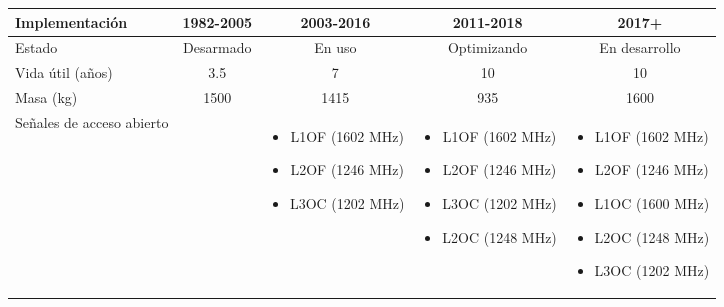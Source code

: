 \begin{center}
\begin{longtable}{|p{3cm}|c|c|c|c|}
        Implementación & 1982-2005 & 2003-2016 & 2011-2018 & 2017+ \\
        \hline
        Estado & Desarmado & En uso & Optimizando & En desarrollo \\
        \hline
        Vida útil (años) & 3.5 & 7 & 10 & 10 \\
        \hline
        Masa (kg) & 1500 & 1415 & 935 & 1600 \\
        \hline
        Señales de acceso abierto & \fontsize{9}{11}\selectfont{L1OF (1602 MHz)} & 
        \parbox[t]{2.5cm}{
            \vspace{-7pt}
            {\fontsize{9}{11}\selectfont
                \begin{itemize}[label={}, leftmargin=0pt, topsep=0pt, partopsep=0pt, parsep=0pt, itemsep=0pt]
                    \item L1OF (1602 MHz)
                    \item L2OF (1246 MHz)
                    \item L3OC (1202 MHz)
                \end{itemize}
            }
        } &
        \parbox[t]{2.5cm}{
            \vspace{-7pt}
            {\fontsize{9}{11}\selectfont
                \begin{itemize}[label={}, leftmargin=0pt, topsep=0pt, partopsep=0pt, parsep=0pt, itemsep=0pt]
                    \item L1OF (1602 MHz)
                    \item L2OF (1246 MHz)
                    \item L3OC (1202 MHz)
                    \item L2OC (1248 MHz)
                \end{itemize}
            }
        } &
        \parbox[t]{2.5cm}{
            \vspace{-7pt}
            {\fontsize{9}{11}\selectfont
                \begin{itemize}[label={}, leftmargin=0pt, topsep=0pt, partopsep=0pt, parsep=0pt, itemsep=0pt]
                    \item L1OF (1602 MHz)
                    \item L2OF (1246 MHz)
                    \item L1OC (1600 MHz)
                    \item L2OC (1248 MHz)
                    \item L3OC (1202 MHz)
                \end{itemize}
}}
\end{longtable}
\end{center}
